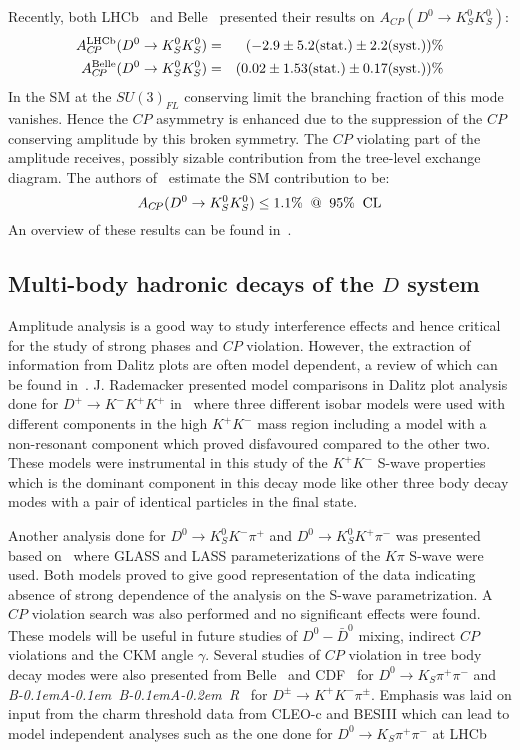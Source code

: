 \documentclass{PoS}
\def\babar{\mbox{\slshape B\kern-0.1em{\smaller A}\kern-0.1em
    B\kern-0.1em{\smaller A\kern-0.2em R}}}
\newcommand{\CP}{{\ensuremath{C\!P}}\xspace}
\newcommand{\stat}{\ensuremath{(\mathrm{stat.})}}
\newcommand{\syst}{\ensuremath{(\mathrm{syst.})}}
\begin{document}
Recently, both LHCb~\cite{Aaij:2015fua} and Belle~\cite{Abdesselam:2016gqq} presented their results on $A_{\CP}(D^0\to K^0_SK^0_S)$:
\begin{eqnarray}
A^{\rm LHCb}_{\CP}(D^0\to K^0_SK^0_S)&=&(-2.9 \pm 5.2\stat\pm 2.2\syst)\% \nonumber\\
A^{\rm Belle}_{\CP}(D^0\to K^0_SK^0_S)&=&(0.02 \pm 1.53\stat\pm 0.17\syst)\%\nonumber
\end{eqnarray}
In the SM at the $SU(3)_{FL}$ conserving limit the branching fraction of this mode vanishes. Hence the \CP asymmetry is enhanced due to the suppression of the \CP conserving amplitude by this broken symmetry. The \CP violating part of the amplitude receives, possibly sizable contribution from the tree-level exchange diagram. The authors of~\cite{Nierste:2015zra} estimate the SM contribution to be:
\begin{equation}
A_{\CP}(D^0\to K^0_SK^0_S)\le 1.1\%\;\;@\;\;95\%\;\;{\rm CL}\nonumber
\end{equation}
An overview of these results can be found in~\cite{Nierste:2017hsw}.
\subsection{Multi-body hadronic decays of the \boldmath $D$ system}
\label{sec:pheno:multi}
Amplitude analysis is a good way to study interference effects and hence critical for the study of strong phases and \CP violation. However, the extraction of information from Dalitz plots are often model dependent, a review of which can be found in~\cite{Amato:2016xjv}. J. Rademacker presented model comparisons in Dalitz plot analysis done for $D^+\to K^-K^+K^+$ in~\cite{LHCb-CONF-2016-008} where three different isobar models were used with different components in the high $K^+K^-$ mass region including a model with a non-resonant component which proved disfavoured compared to the other two. These models were instrumental in this study of the $K^+K^-$ S-wave properties which is the dominant component in this decay mode like other three body decay modes with a pair of identical particles in the final state.

Another analysis done for $D^0\to K^0_SK^-\pi^+$ and $D^0\to K^0_SK^+\pi^-$ was presented based on~\cite{Aaij:2015lsa} where GLASS and LASS parameterizations of the $K\pi$ S-wave were used. Both models proved to give good representation of the data indicating absence of strong dependence of the analysis on the S-wave parametrization. A \CP violation search was also performed and no significant effects were found. These models will be useful in future studies of $D^0 -\bar{D}^0$ mixing, indirect \CP violations and the CKM angle $\gamma$. Several studies of \CP violation in tree body decay modes were also presented from Belle~\cite{Peng:2014oda} and CDF~\cite{Aaltonen:2012nd} for $D^0\to K_S\pi^+\pi^-$ and \babar~\cite{Lees:2012nn} for $D^\pm \to K^+K^-\pi^\pm$. Emphasis was laid on input from the charm threshold data from CLEO-c and BESIII which can lead to model independent analyses such as the one done for $D^0\to K_S\pi^+\pi^-$ at LHCb~\cite{Aaij:2015xoa}
\end{document}
